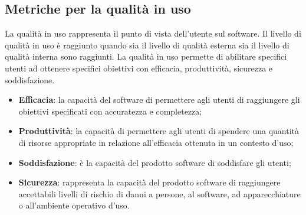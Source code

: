\subsection{Metriche per la qualità in uso}
La qualità in uso rappresenta il punto di vista dell'utente sul software. Il livello di qualità in uso è raggiunto quando sia il livello di qualità esterna sia il livello di qualità interna sono raggiunti. La qualità in uso permette di abilitare specifici utenti ad ottenere specifici obiettivi con efficacia, produttività, sicurezza e soddisfazione.
\begin{itemize}

    \item \textbf{Efficacia}: la capacità del software di permettere agli utenti di raggiungere gli obiettivi specificati con accuratezza e completezza;
    
    \item \textbf{Produttività}: la capacità di permettere agli utenti di spendere una quantità di risorse appropriate in relazione all'efficacia ottenuta in un contesto d'uso;
    
    \item \textbf{Soddisfazione}: è la capacità del prodotto software di soddisfare gli utenti;
    
    \item \textbf{Sicurezza}: rappresenta la capacità del prodotto software di raggiungere accettabili livelli di rischio di danni a persone, al software, ad apparecchiature o all'ambiente operativo d'uso.
    
\end{itemize}

